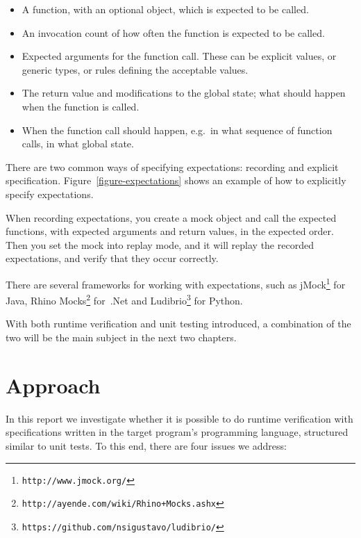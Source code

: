 \documentclass[a4paper,11pt]{kth-mag}
\theoremstyle{definition}
\begin{document}
\begin{itemize}
	\item A function, with an optional object, which is expected to be called.
	\item An invocation count of how often the function is expected to be called.
	\item Expected arguments for the function call. These can be explicit values,
		or generic types, or rules defining the acceptable values.
	\item The return value and modifications to the global state; what should
		happen when the function is called.
	\item When the function call should happen, e.g.\ in what sequence of
		function calls, in what global state.
\end{itemize}

There are two common ways of specifying expectations: recording and explicit
specification. Figure~\ref{figure-expectations} shows an example of how to
explicitly specify expectations.

When recording expectations, you create a mock object and call the expected
functions, with expected arguments and return values, in the expected order.
Then you set the mock into replay mode, and it will replay the recorded
expectations, and verify that they occur correctly.

There are several frameworks for working with expectations, such as
jMock\footnote{\texttt{http://www.jmock.org/}} for Java, Rhino
Mocks\footnote{\texttt{http://ayende.com/wiki/Rhino+Mocks.ashx}} for~.Net and
Ludibrio\footnote{\texttt{https://github.com/nsigustavo/ludibrio/}} for Python.

With both runtime verification and unit testing introduced, a combination of
the two will be the main subject in the next two chapters.






\pagestyle{newchap}
\chapter{Approach} \label{chapter-approach}
\lstset{language=Python}

In this report we investigate whether it is possible to do runtime verification
with specifications written in the target program's programming language,
structured similar to unit tests. To this end, there are four issues we
address:
\end{document}
